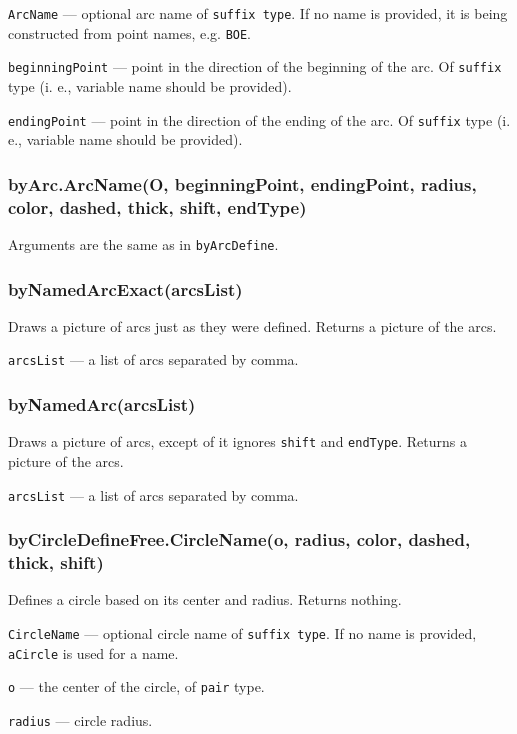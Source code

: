 \documentclass{ltxdoc}
\begin{document}
\texttt{ArcName} — optional arc name of \texttt{suffix type}. If no name is provided, it is being constructed from point names, e.g. \texttt{BOE}.

\texttt{beginningPoint} — point in the direction of the beginning of the arc. Of \texttt{suffix} type (i. e., variable name should be provided).

\texttt{endingPoint} — point in the direction of the ending of the arc. Of \texttt{suffix} type (i. e., variable name should be provided).

\subsubsection{byArc.ArcName(O, beginningPoint, endingPoint, radius, color, dashed, thick, shift, endType)}

Arguments are the same as in \texttt{byArcDefine}.

\subsubsection{byNamedArcExact(arcsList)}
Draws a picture of arcs just as they were defined. Returns a picture of the arcs.

\texttt{arcsList} — a list of arcs separated by comma.

\subsubsection{byNamedArc(arcsList)}
Draws a picture of arcs, except of it ignores \texttt{shift} and \texttt{endType}. Returns a picture of the arcs.

\texttt{arcsList} — a list of arcs separated by comma.


\subsubsection{byCircleDefineFree.CircleName(o, radius, color, dashed, thick, shift)}

Defines a circle based on its center and radius. Returns nothing.

\texttt{CircleName} — optional circle name of \texttt{suffix type}. If no name is provided, \texttt{aCircle} is used for a name.

\texttt{o} — the center of the circle, of \texttt{pair} type.

\texttt{radius} — circle radius.
\end{document}
